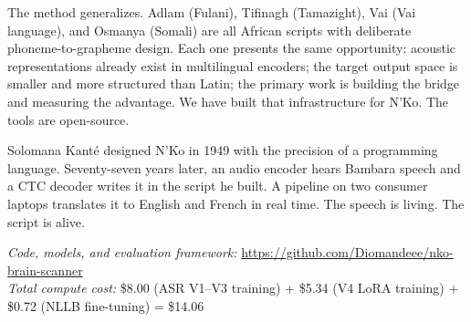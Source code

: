 \documentclass[11pt]{article}
\begin{document}
The method generalizes.
Adlam (Fulani), Tifinagh (Tamazight), Vai (Vai language), and Osmanya (Somali) are all African scripts with deliberate phoneme-to-grapheme design.
Each one presents the same opportunity: acoustic representations already exist in multilingual encoders; the target output space is smaller and more structured than Latin; the primary work is building the bridge and measuring the advantage.
We have built that infrastructure for N'Ko.
The tools are open-source.

Solomana Kant\'{e} designed N'Ko in 1949 with the precision of a programming language.
Seventy-seven years later, an audio encoder hears Bambara speech and a CTC decoder writes it in the script he built.
A pipeline on two consumer laptops translates it to English and French in real time.
The speech is living.
The script is alive.

\vspace{0.5em}
\noindent\textit{Code, models, and evaluation framework:} \url{https://github.com/Diomandeee/nko-brain-scanner}\\
\noindent\textit{Total compute cost:} \$8.00 (ASR V1--V3 training) + \$5.34 (V4 LoRA training) + \$0.72 (NLLB fine-tuning) = \$14.06

\end{document}
